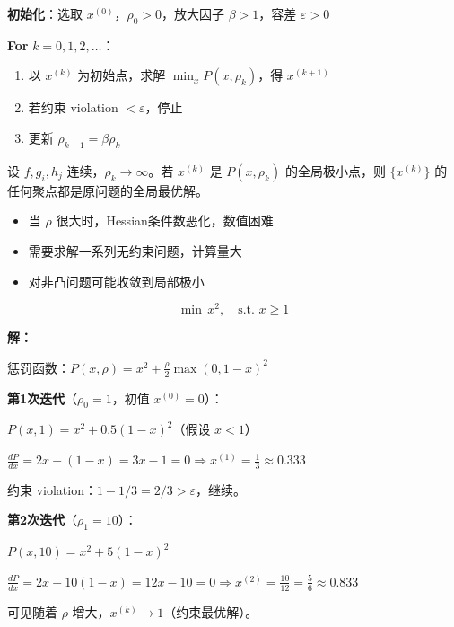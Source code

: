 \begin{algobox}[二次惩罚法算法]
\textbf{初始化}：选取 $x^{(0)}$，$\rho_0 > 0$，放大因子 $\beta > 1$，容差 $\varepsilon > 0$

\textbf{For} $k = 0, 1, 2, \ldots$：
\begin{enumerate}
    \item 以 $x^{(k)}$ 为初始点，求解 $\min_x P(x, \rho_k)$，得 $x^{(k+1)}$
    \item 若约束 violation $< \varepsilon$，停止
    \item 更新 $\rho_{k+1} = \beta \rho_k$
\end{enumerate}
\end{algobox}

\begin{theorem}[二次惩罚法的收敛性]
设 $f, g_i, h_j$ 连续，$\rho_k \to \infty$。若 $x^{(k)}$ 是 $P(x, \rho_k)$ 的全局极小点，则 $\{x^{(k)}\}$ 的任何聚点都是原问题的全局最优解。
\end{theorem}

\begin{notebox}[二次惩罚法的缺点]
\begin{itemize}
    \item 当 $\rho$ 很大时，Hessian条件数恶化，数值困难
    \item 需要求解一系列无约束问题，计算量大
    \item 对非凸问题可能收敛到局部极小
\end{itemize}
\end{notebox}

\begin{example}
\[
\min \, x^2, \quad \text{s.t. } x \geq 1
\]

\textbf{解：}

惩罚函数：$P(x, \rho) = x^2 + \frac{\rho}{2}\max(0, 1-x)^2$

\textbf{第1次迭代}（$\rho_0 = 1$，初值 $x^{(0)} = 0$）：

$P(x, 1) = x^2 + 0.5(1-x)^2$（假设 $x < 1$）

$\frac{dP}{dx} = 2x - (1-x) = 3x - 1 = 0 \Rightarrow x^{(1)} = \frac{1}{3} \approx 0.333$

约束 violation：$1 - 1/3 = 2/3 > \varepsilon$，继续。

\textbf{第2次迭代}（$\rho_1 = 10$）：

$P(x, 10) = x^2 + 5(1-x)^2$

$\frac{dP}{dx} = 2x - 10(1-x) = 12x - 10 = 0 \Rightarrow x^{(2)} = \frac{10}{12} = \frac{5}{6} \approx 0.833$

可见随着 $\rho$ 增大，$x^{(k)} \to 1$（约束最优解）。
\end{example}

